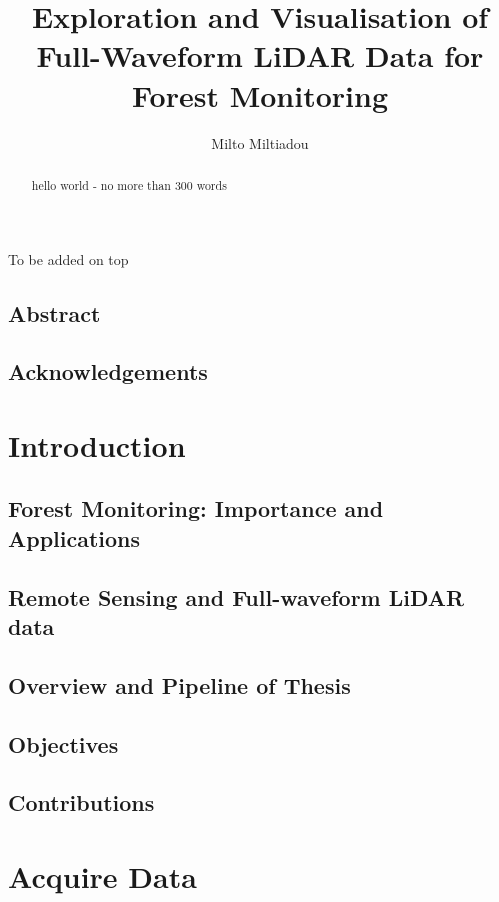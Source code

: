 \documentclass[11pt]{report}
\title{Exploration and Visualisation of Full-Waveform LiDAR Data for Forest Monitoring}
\author{Milto Miltiadou}
\begin{document}
	\maketitle
 		
\begin{abstract}	
     hello world - no more than 300 words
\end{abstract}

\newpage
	\setcounter{secnumdepth}{0}
	To be added on top
	\section{Abstract}\label{Abstract}
		
		\newpage
	\section{Acknowledgements}\label{Acknowledgments}
		
		\newpage
    \tableofcontents	 
		\newpage  
	\setcounter{secnumdepth}{4}	
	\chapter{Introduction} \label{Introduction}
		\section{Forest Monitoring: Importance and Applications}
			
		\section{Remote Sensing and Full-waveform LiDAR data}
			
			\newpage
		
		\section{Overview and Pipeline of Thesis} \label{Overview}
		
				
		\section{Objectives}\label{Aims}
			
		\section{Contributions}\label{Contributions}
			
    \chapter{Acquire Data}\label{AcquireData}
	    
	    \newpage
\end{document}
